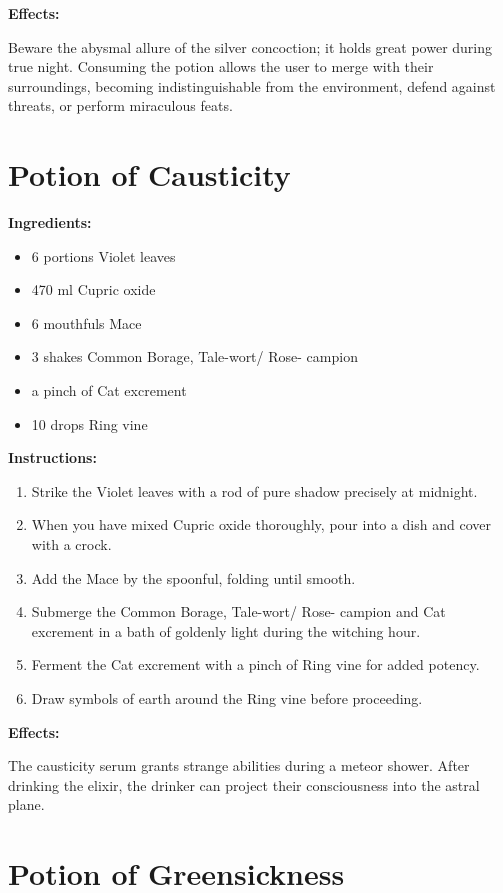 \documentclass{article}
\begin{document}
\textbf{Effects:}

Beware the abysmal allure of the silver concoction; it holds great power during true night. Consuming the potion allows the user to merge with their surroundings, becoming indistinguishable from the environment, defend against threats, or perform miraculous feats.

\newpage
\section*{Potion of Causticity}

\textbf{Ingredients:}

\begin{itemize}
  \item 6 portions Violet leaves
  \item 470 ml Cupric oxide
  \item 6 mouthfuls Mace
  \item 3 shakes Common Borage, Tale-wort/ Rose- campion
  \item a pinch of Cat excrement
  \item 10 drops Ring vine
\end{itemize}

\textbf{Instructions:}

\begin{enumerate}
  \item Strike the Violet leaves with a rod of pure shadow precisely at midnight.
  \item When you have mixed Cupric oxide thoroughly, pour into a dish and cover with a crock.
  \item Add the Mace by the spoonful, folding until smooth.
  \item Submerge the Common Borage, Tale-wort/ Rose- campion and Cat excrement in a bath of goldenly light during the witching hour.
  \item Ferment the Cat excrement with a pinch of Ring vine for added potency.
  \item Draw symbols of earth around the Ring vine before proceeding.
\end{enumerate}

\textbf{Effects:}

The causticity serum grants strange abilities during a meteor shower. After drinking the elixir, the drinker can project their consciousness into the astral plane.

\newpage
\section*{Potion of Greensickness}
\end{document}
